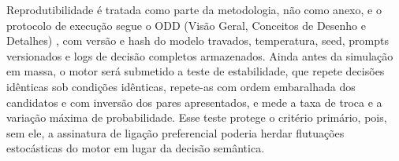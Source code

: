 \documentclass[12pt,oneside,a4paper,brazil,sumario=tradicional]{abntex2}
\begin{document}
Reprodutibilidade é tratada como parte da metodologia, não como anexo, e o protocolo de execução segue o ODD (Visão Geral, Conceitos de Desenho e Detalhes) \parencite{grimm2006}, com versão e hash do modelo travados, temperatura, seed, prompts versionados e logs de decisão completos armazenados. Ainda antes da simulação em massa, o motor será submetido a teste de estabilidade, que repete decisões idênticas sob condições idênticas, repete-as com ordem embaralhada dos candidatos e com inversão dos pares apresentados, e mede a taxa de troca e a variação máxima de probabilidade. Esse teste protege o critério primário, pois, sem ele, a assinatura de ligação preferencial poderia herdar flutuações estocásticas do motor em lugar da decisão semântica.

\postextual
\printbibliography[heading=bibintoc,title={Referências Bibliográficas}]
\end{document}
